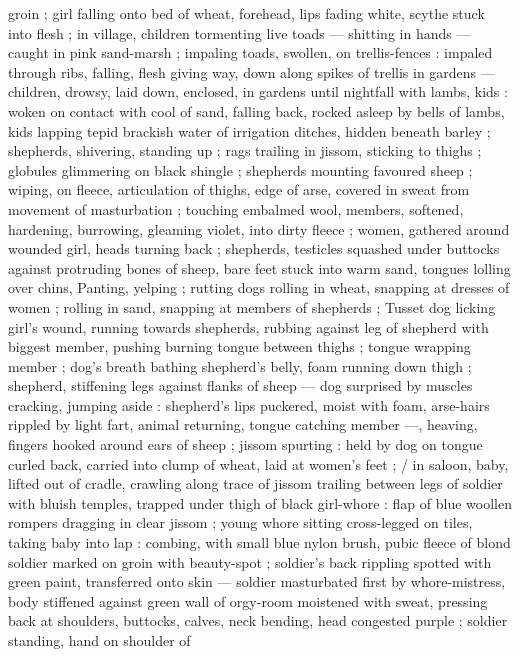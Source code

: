 groin ; girl falling onto bed of wheat, forehead, lips fading white,
scythe stuck into flesh ; in village, children tormenting live toads ---
shitting in hands --- caught in pink sand-marsh ; impaling toads,
swollen, on trellis-fences : impaled through ribs, falling, flesh giving
way, down along spikes of trellis in gardens --- children, drowsy, laid
down, enclosed, in gardens until nightfall with lambs, kids : woken on
contact with cool of sand, falling back, rocked asleep by bells of
lambs, kids lapping tepid brackish water of irrigation ditches, hidden
beneath barley ; shepherds, shivering, standing up ; rags trailing in
jissom, sticking to thighs ; globules glimmering on black shingle ;
shepherds mounting favoured sheep ; wiping, on fleece, articulation
of thighs, edge of arse, covered in sweat from movement of
masturbation ; touching embalmed wool, members, softened,
hardening, burrowing, gleaming violet, into dirty fleece ; women,
gathered around wounded girl, heads turning back ; shepherds,
testicles squashed under buttocks against protruding bones of
sheep, bare feet stuck into warm sand, tongues lolling over chins,
Panting, yelping ; rutting dogs rolling in wheat, snapping at dresses
of women ; rolling in sand, snapping at members of shepherds ;
Tusset dog licking girl's wound, running towards shepherds, rubbing
against leg of shepherd with biggest member, pushing burning %
tongue between thighs ; tongue wrapping member ; dog's breath
bathing shepherd's belly, foam running down thigh ; shepherd,
stiffening legs against flanks of sheep --- dog surprised by muscles
cracking, jumping aside : shepherd's lips puckered, moist with foam,
arse-hairs rippled by light fart, animal returning, tongue catching
member ---, heaving, fingers hooked around ears of sheep ; jissom
spurting : held by dog on tongue curled back, carried into clump of
wheat, laid at women’s feet ; / in saloon, baby, lifted out of cradle,
crawling along trace of jissom trailing between legs of soldier with
bluish temples, trapped under thigh of black girl-whore : flap of blue
woollen rompers dragging in clear jissom ; young whore sitting
cross-legged on tiles, taking baby into lap : combing, with small blue
nylon brush, pubic fleece of blond soldier marked on groin with
beauty-spot ; soldier's back rippling spotted with green paint,
transferred onto skin --- soldier masturbated first by whore-mistress,
body stiffened against green wall of orgy-room moistened with
sweat, pressing back at shoulders, buttocks, calves, neck bending,
head congested purple ; soldier standing, hand on shoulder of

